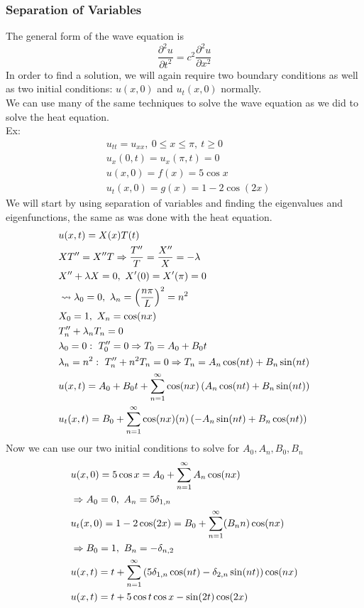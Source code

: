 \documentclass[11pt, fleqn]{article}
\begin{document}
\subsubsection{Separation of Variables}
The general form of the wave equation is
$$\frac{\partial^2 u}{\partial t^2}=c^2\frac{\partial^2u}{\partial x^2}$$
In order to find a solution, we will again require two boundary conditions as well as two initial conditions: $u(x,0)$ and $u_t(x,0)$ normally.\\
We can use many of the same techniques to solve the wave equation as we did to solve the heat equation.\\
Ex:
\begin{align*}
    &u_{tt}=u_{xx},\ 0\leq x\leq \pi,\ t\geq 0\\
    &u_x(0,t)=u_x(\pi,t)=0\\
    &u(x,0)=f(x)=5\cos x\\
    &u_t(x,0)=g(x)=1-2\cos(2x)
\end{align*}
We will start by using separation of variables and finding the eigenvalues and eigenfunctions, the same as was done with the heat equation.
\begin{align*}
    &u(x,t)=X(x)T(t)\\
    &XT''=X''T\Ra \frac{T''}{T}=\frac{X''}{X}=-\lambda\\
    &X''+\lambda X=0,\ X'(0)=X'(\pi)=0\\
    &\leadsto \lambda_0=0,\ \lambda_n=\brround{\frac{n\pi}{L}}^2=n^2\\
    &X_0=1,\ X_n=\cos(nx)\\
    &T_n''+\lambda_n T_n=0\\
    &\lambda_0=0:\ T_0''=0\Ra T_0=A_0+B_0t\\
    &\lambda_n=n^2:\ T_n''+n^2T_n=0\Ra T_n=A_n\cos(nt)+B_n\sin(nt)\\
    &u(x,t)=A_0+B_0t+\sum_{n=1}^\infty\cos(nx)\brround{A_n\cos(nt)+B_n\sin(nt)}\\
    &u_t(x,t)=B_0+\sum_{n=1}^\infty\cos(nx)(n)\brround{-A_n\sin(nt)+B_n\cos(nt)}
\end{align*}
Now we can use our two initial conditions to solve for $A_0,A_n,B_0,B_n$
\begin{align*}
    &u(x,0)=5\cos x=A_0+\sum_{n=1}^\infty A_n\cos(nx)\\
    &\Rightarrow A_0=0,\ A_n=5\delta_{1,n}\\
    &u_t(x,0)=1-2\cos(2x)=B_0+\sum_{n=1}^\infty(B_n n)\cos(nx)\\
    &\Rightarrow B_0=1,\ B_n=-\delta_{n,2}\\
    &u(x,t)=t+\sum_{n=1}^\infty\left( 5\delta_{1,n}\cos(nt)-\delta_{2,n}\sin(nt) \right)\cos(nx)\\
    &u(x,t)=t+5\cos t\cos x-\sin(2t)\cos(2x)
\end{align*}
\end{document}
